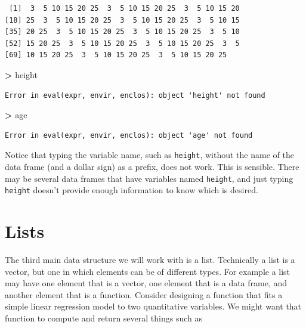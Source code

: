 \documentclass[]{krantz}
\makeatletter
\newenvironment{Shaded}{\begin{snugshade}}{\end{snugshade}}
\newcommand{\NormalTok}[1]{#1}
\newcommand{\OperatorTok}[1]{\textcolor[rgb]{0.43,0.43,0.43}{\textbf{#1}}}
\newcommand{\StringTok}[1]{\textcolor[rgb]{0.5,0.5,0.5}{#1}}
\newenvironment{kframe}{%
\medskip{}
\setlength{\fboxsep}{.8em}
 \def\at@end@of@kframe{}%
 \ifinner\ifhmode%
  \def\at@end@of@kframe{\end{minipage}}%
  \begin{minipage}{\columnwidth}%
 \fi\fi%
 \def\FrameCommand##1{\hskip\@totalleftmargin \hskip-\fboxsep
 \colorbox{shadecolor}{##1}\hskip-\fboxsep
     \hskip-\linewidth \hskip-\@totalleftmargin \hskip\columnwidth}%
 \MakeFramed {\advance\hsize-\width
   \@totalleftmargin\z@ \linewidth\hsize
   \@setminipage}}%
 {\par\unskip\endMakeFramed%
 \at@end@of@kframe}
\renewenvironment{Shaded}{\begin{kframe}}{\end{kframe}}
\makeatother
\begin{document}
\begin{Shaded}
\end{Shaded}

\begin{verbatim}
 [1]  3  5 10 15 20 25  3  5 10 15 20 25  3  5 10 15 20
[18] 25  3  5 10 15 20 25  3  5 10 15 20 25  3  5 10 15
[35] 20 25  3  5 10 15 20 25  3  5 10 15 20 25  3  5 10
[52] 15 20 25  3  5 10 15 20 25  3  5 10 15 20 25  3  5
[69] 10 15 20 25  3  5 10 15 20 25  3  5 10 15 20 25
\end{verbatim}

\begin{Shaded}
\begin{Highlighting}[]
\OperatorTok{>}\StringTok{ }\NormalTok{height}
\end{Highlighting}
\end{Shaded}

\begin{verbatim}
Error in eval(expr, envir, enclos): object 'height' not found
\end{verbatim}

\begin{Shaded}
\begin{Highlighting}[]
\OperatorTok{>}\StringTok{ }\NormalTok{age}
\end{Highlighting}
\end{Shaded}

\begin{verbatim}
Error in eval(expr, envir, enclos): object 'age' not found
\end{verbatim}

Notice that typing the variable name, such as \texttt{height}, without the name of the data frame (and a dollar sign) as a prefix, does not work. This is sensible. There may be several data frames that have variables named \texttt{height}, and just typing \texttt{height} doesn't provide enough information to know which is desired.

\hypertarget{lists}{%
\section{Lists}\label{lists}}

The third main data structure we will work with is a list. Technically a list is a vector, but one in which elements can be of different types. For example a list may have one element that is a vector, one element that is a data frame, and another element that is a function. Consider designing a function that fits a simple linear regression model to two quantitative variables. We might want that function to compute and return several things such as
\end{document}
